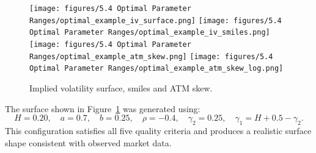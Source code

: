 \begin{figure}[H]
    \centering
    \texttt{[image: figures/5.4 Optimal Parameter Ranges/optimal\_example\_iv\_surface.png]}
    \texttt{[image: figures/5.4 Optimal Parameter Ranges/optimal\_example\_iv\_smiles.png]}
    \texttt{[image: figures/5.4 Optimal Parameter Ranges/optimal\_example\_atm\_skew.png]}
    \texttt{[image: figures/5.4 Optimal Parameter Ranges/optimal\_example\_atm\_skew\_log.png]}
    \caption{Implied volatility surface, smiles and ATM skew.}
    \label{fig:OptimalExampleSurface}
\end{figure}

The surface shown in Figure~\ref{fig:OptimalExampleSurface} was generated using:
\[
H = 0.20, \quad a = 0.7, \quad b = 0.25, \quad \rho = -0.4, \quad \gamma_2 = 0.25, \quad \gamma_1 = H + 0.5 - \gamma_2.
\]
This configuration satisfies all five quality criteria and produces a realistic surface shape consistent with observed market data.